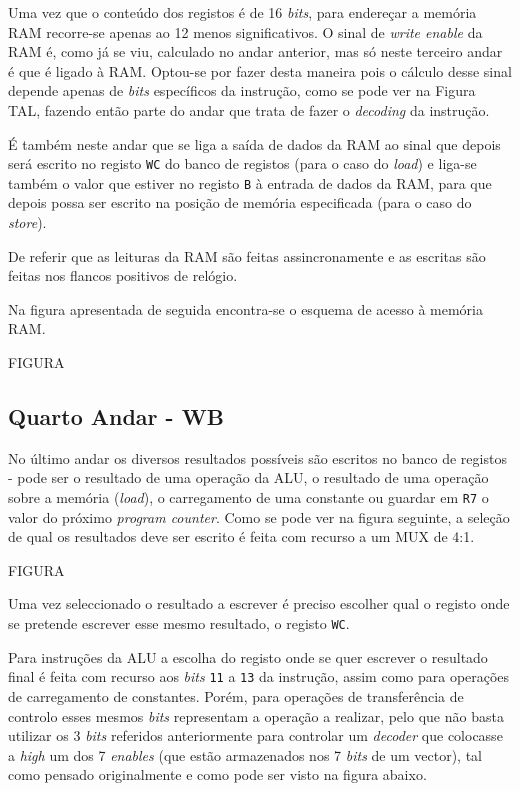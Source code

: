 \documentclass[11pt]{article}
\numberwithin{equation}{section}
\begin{document}
Uma vez que o conteúdo dos registos é de 16 \textit{bits}, para endereçar a memória RAM recorre-se apenas ao 12 menos significativos. O sinal de \textit{write enable} da RAM é, como já se viu, calculado no andar anterior, mas só neste terceiro andar é que é ligado à RAM. Optou-se por fazer desta maneira pois o cálculo desse sinal depende apenas de \textit{bits} específicos da instrução, como se pode ver na Figura TAL, fazendo então parte do andar que trata de fazer o \textit{decoding} da instrução.

É também neste andar que se liga a saída de dados da RAM ao sinal que depois será escrito no registo \texttt{WC} do banco de registos (para o caso do \textit{load}) e liga-se também o valor que estiver no registo \texttt{B} à entrada de dados da RAM, para que depois possa ser escrito na posição de memória especificada (para o caso do \textit{store}).

De referir que as leituras da RAM são feitas assincronamente e as escritas são feitas nos flancos positivos de relógio. 

Na figura apresentada de seguida encontra-se o esquema de acesso à memória RAM.

FIGURA

\subsection{Quarto Andar - WB}

No último andar os diversos resultados possíveis são escritos no banco de registos - pode ser o resultado de uma operação da ALU, o resultado de uma operação sobre a memória (\textit{load}), o carregamento de uma constante ou guardar em \texttt{R7} o valor do próximo \textit{program counter}. Como se pode ver na figura seguinte, a seleção de qual os resultados deve ser escrito é feita com recurso a um MUX de 4:1. 

FIGURA

Uma vez seleccionado o resultado a escrever é preciso escolher qual o registo onde se pretende escrever esse mesmo resultado, o registo \texttt{WC}. 

Para instruções da ALU a escolha do registo onde se quer escrever o resultado final é feita com recurso aos \textit{bits} \texttt{11} a \texttt{13} da instrução, assim como para operações de carregamento de constantes. Porém, para operações de transferência de controlo esses mesmos \textit{bits} representam a operação a realizar, pelo que não basta utilizar os 3 \textit{bits} referidos anteriormente para controlar um \textit{decoder} que colocasse a \textit{high} um dos 7 \textit{enables} (que estão armazenados nos 7 \textit{bits} de um vector), tal como pensado originalmente e como pode ser visto na figura abaixo.
\end{document}
